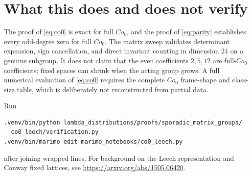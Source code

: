 \documentclass[11pt]{article}
\begin{document}
\section{What this does and does not verify}
The proof of \eqref{eq:co0} is exact for full $Co_0$, and the proof of
\eqref{eq:parity} establishes every odd-degree zero for full $Co_0$.  The
matrix sweep validates determinant expansion, sign cancellation, and direct
invariant counting in dimension $24$ on a genuine subgroup.  It does not
claim that the even coefficients $2,5,12$ are full-$Co_0$ coefficients; fixed
spaces can shrink when the acting group grows.  A full numerical evaluation
of \eqref{eq:co0} requires the complete $Co_0$ frame-shape and class-size
table, which is deliberately not reconstructed from partial data.

Run
\begin{verbatim}
.venv/bin/python lambda_distributions/proofs/sporadic_matrix_groups/
  co0_leech/verification.py
.venv/bin/marimo edit marimo_notebooks/co0_leech.py
\end{verbatim}
after joining wrapped lines.  For background on the Leech representation and
Conway fixed lattices, see \url{https://arxiv.org/abs/1505.06420}.
\end{document}
